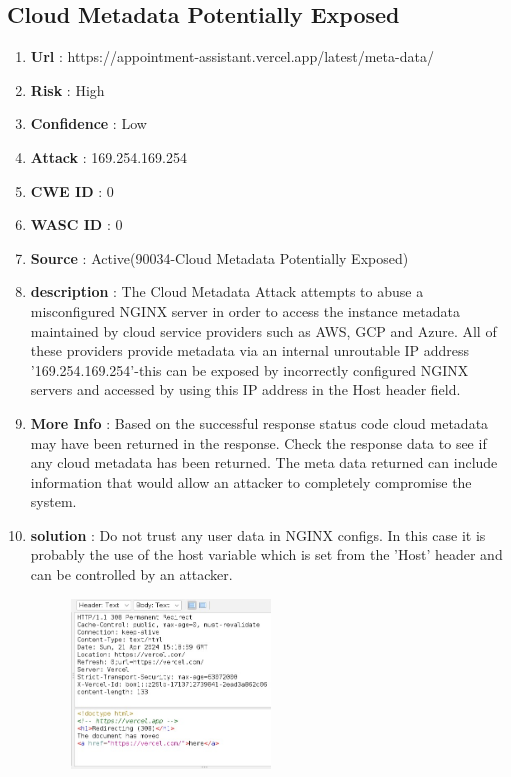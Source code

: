 \documentclass[openany]{report}
\begin{document}
\subsection{Cloud Metadata Potentially Exposed}
\begin{enumerate}
    \item \textbf{Url} : https://appointment-assistant.vercel.app/latest/meta-data/
    \item \textbf{Risk} : High
    \item \textbf{Confidence} : Low
    \item \textbf{Attack} : 169.254.169.254
    \item \textbf{CWE ID} : 0
    \item \textbf{WASC ID} : 0
    \item \textbf{Source} : Active(90034-Cloud Metadata Potentially Exposed)
    \item \textbf{description} : The Cloud Metadata Attack attempts to abuse a misconfigured NGINX server in order to access the instance metadata maintained by cloud service providers such as AWS, GCP and Azure. All of these providers provide metadata via an internal unroutable IP address '169.254.169.254'-this can be exposed by incorrectly configured NGINX servers and accessed by using this IP address in the Host header field.
    \item \textbf{More Info} : Based on the successful response status code cloud metadata may have been returned in the response. Check the response data to see if any cloud metadata has been returned. The meta data returned can include information that would allow an attacker to completely compromise the system.
    \item \textbf{solution} : Do not trust any user data in NGINX configs. In this case it is probably the use of the host variable which is set from the 'Host' header and can be controlled by an attacker.
          \begin{figure}[h]
              \centering
              \includegraphics[width=0.5\textwidth]{imgs/1.jpg}

\end{figure}
\end{enumerate}
\end{document}
